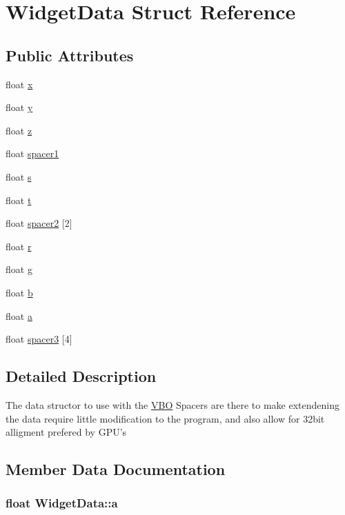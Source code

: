 \hypertarget{struct_widget_data}{
\section{WidgetData Struct Reference}
\label{struct_widget_data}
}
\subsection*{Public Attributes}
\begin{CompactItemize}
\item 
float \hyperlink{struct_widget_data_27f4a7fb857088802a0098b436a50a47}{x}
\item 
float \hyperlink{struct_widget_data_8898221a2196e0fdfeac3afa3e9afef9}{y}
\item 
float \hyperlink{struct_widget_data_baed207ae9d6f8915bb5a896e9771069}{z}
\item 
float \hyperlink{struct_widget_data_0268037f4d82203ecf57367334e9dce5}{spacer1}
\item 
float \hyperlink{struct_widget_data_693c095dd623e4bc20171c2e08f957e9}{s}
\item 
float \hyperlink{struct_widget_data_c0b9197fbae2e0b4233126328f519a9f}{t}
\item 
float \hyperlink{struct_widget_data_11ce418c961bbd675f6e587ad962facb}{spacer2} \mbox{[}2\mbox{]}
\item 
float \hyperlink{struct_widget_data_6b2f9ee318156288411023de486cbcf5}{r}
\item 
float \hyperlink{struct_widget_data_af0cac25ca856c798d952503af45a101}{g}
\item 
float \hyperlink{struct_widget_data_2ebbe9d161b9aa15e5d84a8d18cf3729}{b}
\item 
float \hyperlink{struct_widget_data_4dd4381367f73cd570fe2de4c7b8935a}{a}
\item 
float \hyperlink{struct_widget_data_3bb714da098f37055f6d1fbc3926a85b}{spacer3} \mbox{[}4\mbox{]}
\end{CompactItemize}


\subsection{Detailed Description}
The data structor to use with the \hyperlink{class_v_b_o}{VBO} Spacers are there to make extendening the data require little modification to the program, and also allow for 32bit alligment prefered by GPU's 

\subsection{Member Data Documentation}
\hypertarget{struct_widget_data_4dd4381367f73cd570fe2de4c7b8935a}{
\subsubsection[{a}]{\setlength{\rightskip}{0pt plus 5cm}float {\bf WidgetData::a}}}
\label{struct_widget_data_4dd4381367f73cd570fe2de4c7b8935a}



